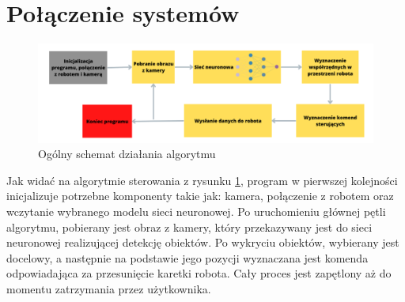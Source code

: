 \section{Połączenie systemów}
\begin{figure}[H]
	\centering
	\includegraphics[width=16cm]{pages/siecIRobot/zdjecia/schematAlgorytmu.png}
	\caption{Ogólny schemat działania algorytmu}
	\label{rys:algorytmSterowania}
\end{figure}
Jak widać na algorytmie sterowania z rysunku \ref{rys:algorytmSterowania}, program w pierwszej kolejności inicjalizuje potrzebne komponenty
takie jak: kamera, połączenie z robotem oraz wczytanie wybranego modelu sieci neuronowej.
Po uruchomieniu głównej pętli algorytmu, pobierany jest obraz z kamery, który przekazywany jest do sieci neuronowej realizującej 
detekcję obiektów. Po wykryciu obiektów, wybierany jest docelowy, a następnie na podstawie jego pozycji wyznaczana jest komenda odpowiadająca 
za przesunięcie karetki robota. Cały proces jest zapętlony aż do momentu zatrzymania przez użytkownika. 
